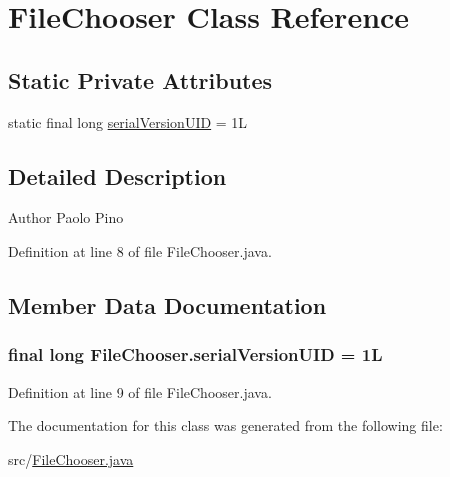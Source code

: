 \hypertarget{class_file_chooser}{\section{File\-Chooser Class Reference}
\label{class_file_chooser}
}
\subsection*{Static Private Attributes}
\begin{DoxyCompactItemize}
\item 
static final long \hyperlink{class_file_chooser_a3cbd18488adfa238990fc2faf44a2931}{serial\-Version\-U\-I\-D} = 1\-L
\end{DoxyCompactItemize}


\subsection{Detailed Description}
\begin{DoxyAuthor}{Author}
Paolo Pino 
\end{DoxyAuthor}


Definition at line 8 of file File\-Chooser.\-java.



\subsection{Member Data Documentation}
\hypertarget{class_file_chooser_a3cbd18488adfa238990fc2faf44a2931}{
\subsubsection[{serial\-Version\-U\-I\-D}]{\setlength{\rightskip}{0pt plus 5cm}final long {\bf File\-Chooser.\-serial\-Version\-U\-I\-D} = 1\-L}}\label{class_file_chooser_a3cbd18488adfa238990fc2faf44a2931}


Definition at line 9 of file File\-Chooser.\-java.



The documentation for this class was generated from the following file\-:\begin{DoxyCompactItemize}
\item 
src/\hyperlink{_file_chooser_8java}{File\-Chooser.\-java}\end{DoxyCompactItemize}
